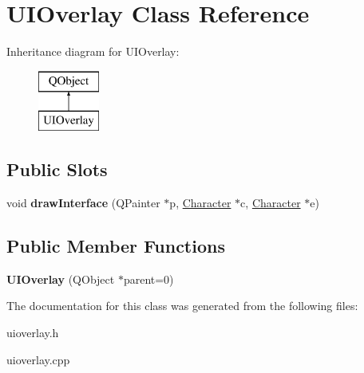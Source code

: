 \hypertarget{class_u_i_overlay}{}\section{U\+I\+Overlay Class Reference}
\label{class_u_i_overlay}
Inheritance diagram for U\+I\+Overlay\+:\begin{figure}[H]
\begin{center}
\leavevmode
\includegraphics[height=2.000000cm]{class_u_i_overlay}
\end{center}
\end{figure}
\subsection*{Public Slots}
\begin{DoxyCompactItemize}
\item 
\hypertarget{class_u_i_overlay_a9b3960185a836ecb504ce25d22c1893e}{}void {\bfseries draw\+Interface} (Q\+Painter $\ast$p, \hyperlink{class_character}{Character} $\ast$c, \hyperlink{class_character}{Character} $\ast$e)\label{class_u_i_overlay_a9b3960185a836ecb504ce25d22c1893e}

\end{DoxyCompactItemize}
\subsection*{Public Member Functions}
\begin{DoxyCompactItemize}
\item 
\hypertarget{class_u_i_overlay_a51696f81d4333f2c7537a103d9440c47}{}{\bfseries U\+I\+Overlay} (Q\+Object $\ast$parent=0)\label{class_u_i_overlay_a51696f81d4333f2c7537a103d9440c47}

\end{DoxyCompactItemize}


The documentation for this class was generated from the following files\+:\begin{DoxyCompactItemize}
\item 
uioverlay.\+h\item 
uioverlay.\+cpp\end{DoxyCompactItemize}
